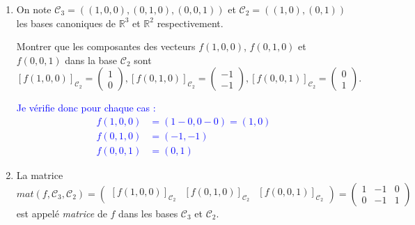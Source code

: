 \documentclass[a4paper,12pt]{article}
\def\R{\mathbb{R}}
\newcommand{\add}[1]{\textcolor{blue}{#1}}
\begin{document}
\begin{exercice}
\begin{enumerate}
        \bigskip
            
        \item On note $\mathcal C_3 = \left( (1,0,0), (0,1,0), (0,0,1) \right)$ et 
            $\mathcal C_2 = \left( (1,0), (0,1) \right)$ les bases canoniques de $\R^3$ et $\R^2$ respectivement.

            Montrer que les composantes des vecteurs $f(1,0,0)$, $f(0,1,0)$ et $f(0,0,1)$ dans la base $\mathcal C_2$ sont 
            $$
            [f(1,0,0)]_{\mathcal C_2} = \left( \begin{array}{c} 1 \\ 0 \end{array} \right),
            [f(0,1,0)]_{\mathcal C_2} = \left( \begin{array}{c} -1 \\ -1 \end{array} \right),
            [f(0,0,1)]_{\mathcal C_2} = \left( \begin{array}{c} 0 \\ 1 \end{array} \right).
            $$

            \add{
            Je vérifie donc pour chaque cas : 
                \begin{align}
                    f(1,0,0)&=(1-0,0-0)=(1,0)\\
                    f(0,1,0)&=(-1,-1)\\
                    f(0,0,1)&=(0,1)
                \end{align}
          }


        \item La matrice 
            $$mat(f,\mathcal C_3, \mathcal C_2)=\left( 
                  \begin{array}{c|c|c}
                      [f(1,0,0)]_{\mathcal C_2} & [f(0,1,0)]_{\mathcal C_2} & [f(0,0,1)]_{\mathcal C_2}
                  \end{array}             
                \right) 
               = 
                 \left( 
                   \begin{array}{ccc}
                       1 & -1 & 0 \\
                       0 & -1 & 1
                   \end{array}
                   \right)
                $$
            est appelé \emph{matrice} de $f$ dans les bases $\mathcal C_3$ et $\mathcal C_2$. 


\end{enumerate}
\end{exercice}
\end{document}
